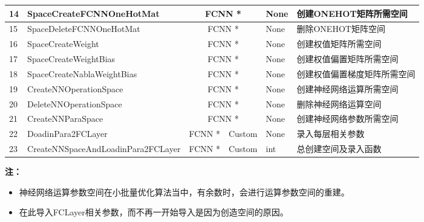 \documentclass[UTF-8]{progbookcn}
\begin{document}
\begin{table}[!h]
{\begin{tabular}{|l|l|c|c|l|l|l|}
14 & SpaceCreateFCNNOneHotMat           & \multicolumn{3}{c|}{FCNN *}                & None      & 创建ONEHOT矩阵所需空间   \\ \hline
15 & SpaceDeleteFCNNOneHotMat           & \multicolumn{3}{c|}{FCNN *}                & None      & 删除ONEHOT矩阵空间     \\ \hline
16 & SpaceCreateWeight                  & \multicolumn{3}{c|}{FCNN *}                & None      & 创建权值矩阵所需空间       \\ \hline
17 & SpaceCreateWeightBias              & \multicolumn{3}{c|}{FCNN *}                & None      & 创建权值偏置矩阵所需空间     \\ \hline
18 & SpaceCreateNablaWeightBias         & \multicolumn{3}{c|}{FCNN *}                & None      & 创建权值偏置梯度矩阵所需空间   \\ \hline
19 & CreateNNOperationSpace             & \multicolumn{3}{c|}{FCNN *}                & None      & 创建神经网络运算所需空间     \\ \hline
20 & DeleteNNOperationSpace             & \multicolumn{3}{c|}{FCNN *}                & None      & 删除神经网络运算空间       \\ \hline
21 & CreateNNParaSpace                  & \multicolumn{3}{c|}{FCNN *}                & None      & 创建神经网络参数所需空间     \\ \hline
22 & DoadinPara2FCLayer                 & FCNN *       & \multicolumn{2}{c|}{Custom} & None      & 录入每层相关参数         \\ \hline
23 & CreateNNSpaceAndLoadinPara2FCLayer & FCNN *       & \multicolumn{2}{c|}{Custom} & int       & 总创建空间及录入函数       \\ \hline
\end{tabular}}
\end{table}
\noindent\textbf{注：}
\begin{itemize}
  \item 神经网络运算参数空间在小批量优化算法当中，有余数时，会进行运算参数空间的重建。
  \item 在此导入FCLayer相关参数，而不再一开始导入是因为创造空间的原因。
\end{itemize}
\end{document}
